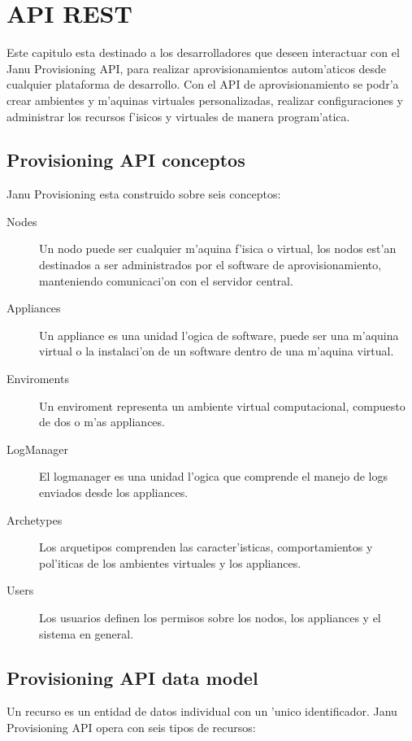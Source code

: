 \chapter{API REST}
\label{capapi}

Este capitulo esta destinado a los desarrolladores que deseen interactuar con el Janu Provisioning API, para realizar aprovisionamientos autom'aticos desde cualquier plataforma de desarrollo. Con el API de aprovisionamiento se podr'a crear ambientes y m'aquinas virtuales personalizadas, realizar configuraciones y administrar los recursos f'isicos y virtuales de manera program'atica.

\section{Provisioning API conceptos}
Janu Provisioning esta construido sobre seis conceptos:

\begin{description}
\item[Nodes] Un nodo puede ser cualquier m'aquina f'isica o virtual, los nodos est'an destinados a ser administrados por el software de aprovisionamiento, manteniendo comunicaci'on con el servidor central.
\item[Appliances] Un appliance es una unidad l'ogica de software, puede ser una m'aquina virtual o la instalaci'on de un software dentro de una m'aquina virtual.
\item[Enviroments] Un enviroment representa un ambiente virtual computacional, compuesto de dos o m'as appliances.
\item[LogManager] El logmanager es una unidad l'ogica que comprende el manejo de logs enviados desde los appliances.
\item [Archetypes] Los arquetipos comprenden las caracter'isticas, comportamientos y pol'iticas de los ambientes virtuales y los appliances. 
\item [Users] Los usuarios definen los permisos sobre los nodos, los appliances y el sistema en general.
\end{description}

\section{Provisioning API data model}
Un recurso es un entidad de datos individual con un 'unico identificador. Janu Provisioning API opera con seis tipos de recursos:


